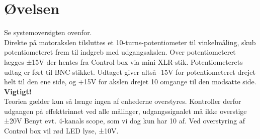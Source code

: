 \documentclass[]{report}
\begin{document}
\newpage	
\section{Øvelsen}
Se systemoversigten ovenfor.\\

\noindent Direkte på motorakslen tilsluttes et 10-turns-potentiometer til vinkelmåling, skub potentiometeret frem til indgreb med udgangsakslen. Over potentiometeret lægges ±15V der hentes fra Control box via mini XLR-stik. Potentiometerets udtag er ført til BNC-stikket. Udtaget giver altså -15V for potentiometeret drejet helt til den ene side, og +15V for akslen drejet 10 omgange til den modsatte side.\\
\newline \textbf{Vigtigt!} \\
Teorien gælder kun så længe ingen af enhederne overstyres. Kontroller derfor udgangen på effekttrinnet ved alle målinger, udgangssignalet må ikke overstige ±20V
Benyt evt. 4-kanals scope, som vi dog kun har 10 af. Ved overstyring af Control box vil rød LED lyse, ±10V.
\end{document}
